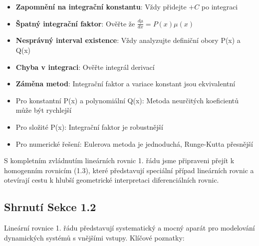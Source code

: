 \vspace{0.8\baselineskip}

\begin{remark}
\begin{itemize}
\item \textbf{Zapomnění na integrační konstantu}: Vždy přidejte $+C$ po integraci
\item \textbf{Špatný integrační faktor}: Ověřte že $\frac{d\mu}{dx} = P(x)\mu(x)$
\item \textbf{Nesprávný interval existence}: Vždy analyzujte definiční obory P(x) a Q(x)
\item \textbf{Chyba v integraci}: Ověřte integrál derivací
\item \textbf{Záměna metod}: Integrační faktor a variace konstant jsou ekvivalentní
\end{itemize}
\end{remark}

\vspace{0.6\baselineskip}

\begin{remark}
\begin{itemize}
\item Pro konstantní P(x) a polynomiální Q(x): Metoda neurčitých koeficientů může být rychlejší
\item Pro složité P(x): Integrační faktor je robustnější
\item Pro numerické řešení: Eulerova metoda je jednoduchá, Runge-Kutta přesnější
\end{itemize}
\end{remark}

\vspace{0.8\baselineskip}

\begin{transition}
S kompletním zvládnutím lineárních rovnic 1. řádu jsme připraveni přejít k homogenním rovnicím (1.3), které představují speciální případ lineárních rovnic a otevírají cestu k hlubší geometrické interpretaci diferenciálních rovnic.
\end{transition}

\vspace{0.8\baselineskip}

\subsection*{Shrnutí Sekce 1.2}

Lineární rovnice 1. řádu představují systematický a mocný aparát pro modelování dynamických systémů s vnějšími vstupy. Klíčové poznatky:

